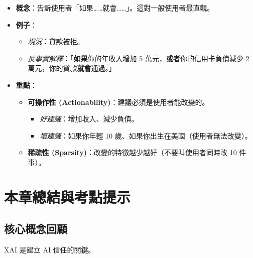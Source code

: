 \documentclass[
  letterpaper,
  DIV=11,
  numbers=noendperiod]{scrreprt}
\providecommand{\tightlist}{%
  \setlength{\itemsep}{0pt}\setlength{\parskip}{0pt}}
\begin{document}
\begin{itemize}
\tightlist
\item
  \textbf{概念}：告訴使用者「如果\ldots\ldots 就會\ldots\ldots」。這對一般使用者最直觀。
\item
  \textbf{例子}：

  \begin{itemize}
  \tightlist
  \item
    \emph{現況}：貸款被拒。
  \item
    \emph{反事實解釋}：「\textbf{如果}你的年收入增加 5
    萬元，\textbf{或者}你的信用卡負債減少 2
    萬元，你的貸款\textbf{就會}通過。」
  \end{itemize}
\item
  \textbf{重點}：

  \begin{itemize}
  \tightlist
  \item
    \textbf{可操作性 (Actionability)}：建議必須是使用者能改變的。

    \begin{itemize}
    \tightlist
    \item
      \emph{好建議}：增加收入、減少負債。
    \item
      \emph{壞建議}：如果你年輕 10
      歲、如果你出生在美國（使用者無法改變）。
    \end{itemize}
  \item
    \textbf{稀疏性 (Sparsity)}：改變的特徵越少越好（不要叫使用者同時改
    10 件事）。
  \end{itemize}
\end{itemize}

\chapter{本章總結與考點提示}\label{sec-chapter10-summary}

\section{核心概念回顧}\label{ux6838ux5fc3ux6982ux5ff5ux56deux9867-9}

XAI 是建立 AI 信任的關鍵。
\end{document}
